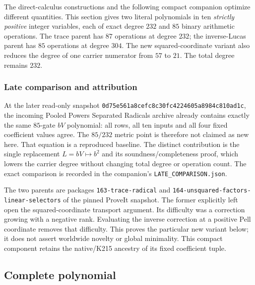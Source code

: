 \label{sec:compact-companion}

The direct-calculus constructions and the following compact companion
optimize different quantities.  This section gives two literal polynomials
in ten \emph{strictly positive} integer variables, each of exact degree
$232$ and $85$ binary arithmetic operations.  The trace parent has
$87$ operations at degree $232$; the inverse-Lucas parent has $85$
operations at degree $304$.  The new squared-coordinate variant also
reduces the degree of one carrier numerator from $57$ to $21$.
The total degree remains $232$.

\subsubsection*{Late comparison and attribution}
At the later read-only snapshot
\texttt{0d75e561a8cefc8c30fc4224605a8984c810ad1c}, the incoming
Pooled Powers Separated Radicals archive already contains exactly the
same $85$-gate $bV$ polynomial: all rows, all ten inputs and all four fixed
coefficient values agree.  The $85/232$ metric point is therefore not
claimed as new here.  That equation is a reproduced baseline.  The
distinct contribution is the single replacement $L=bV\mapsto b^2$
and its soundness/completeness proof, which lowers the carrier degree
without changing total degree or operation count.  The exact comparison
is recorded in the companion's \texttt{LATE\_COMPARISON.json}.

The two parents are packages \texttt{163-trace-radical} and
\texttt{164-unsquared-factors-linear-selectors} of the pinned ProveIt
snapshot.  The former explicitly left open the squared-coordinate
transport argument.  Its difficulty was a correction growing with a
negative rank.  Evaluating the inverse correction at a positive Pell
coordinate removes that difficulty.  This proves the particular new
variant below; it does not assert worldwide novelty or global minimality.
This compact component retains the native/K215 ancestry of its fixed
coefficient tuple.

\subsection{Complete polynomial}

